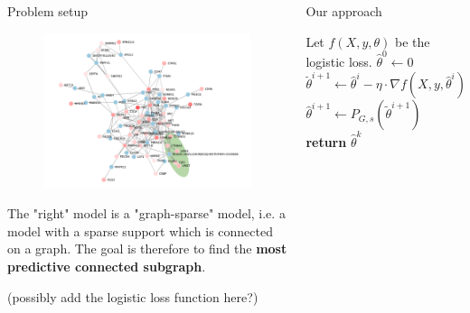 \documentclass[svgnames,final]{beamer}
\newcommand{\thetatilde}{\ensuremath{\tilde{\theta}}}
\newcommand{\thetahat}{\ensuremath{\hat{\theta}}}
\begin{document}
\begin{frame}
\begin{columns}[T]
\begin{column}{.3\linewidth}
\begin{block}{Problem setup}
		\begin{figure}[h]
		\centering
		\includegraphics[width=0.8\linewidth]{images/graph.pdf}
		\end{figure}

		The "right" model is a "graph-sparse" model, i.e. a model with a sparse support which is connected on a graph.
		The goal is therefore to find the \textbf{most predictive connected subgraph}.

		(possibly add the logistic loss function here?)

	\end{block}

	\vspace{2cm}

\end{column}

\begin{column}{.3\linewidth}

	\begin{block}{Our approach}

		\begin{algorithmic}%
		\State Let $f(X, y, \theta)$ be the logistic loss.
		\State $\thetahat^0 \gets 0$
		\State $\thetatilde^{i+1} \gets \thetahat^i - \eta \cdot \nabla f(X, y, \thetahat^i)$
		\State $\thetahat^{i+1} \gets P_{G,s}(\thetatilde^{i+1})$ 
		\EndFor
		\State \textbf{return} $\thetahat^k$
		\EndFunction
		\end{algorithmic}



\end{block}
\end{column}
\end{columns}
\end{frame}
\end{document}
